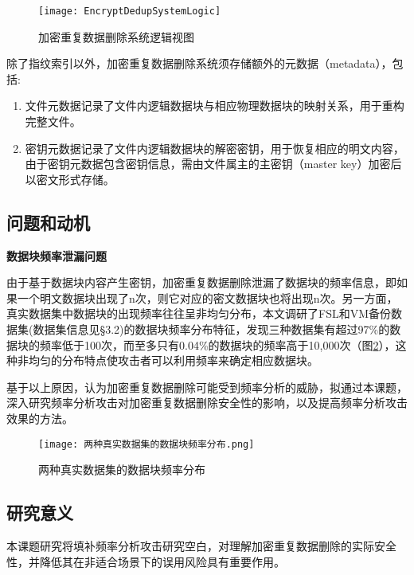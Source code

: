 \begin{figure}[!htb]
    \small
    \centering
    \texttt{[image: EncryptDedupSystemLogic]}
    \caption{加密重复数据删除系统逻辑视图}
    \label{fig:加密重复数据删除系统逻辑视图}
\end{figure}

除了指纹索引以外，加密重复数据删除系统须存储额外的元数据（metadata），包括:
\begin{enumerate}
    \item 文件元数据记录了文件内逻辑数据块与相应物理数据块的映射关系，用于重构完整文件。
    \item 密钥元数据记录了文件内逻辑数据块的解密密钥，用于恢复相应的明文内容，由于密钥元数据包含密钥信息，需由文件属主的主密钥（master key）加密后以密文形式存储。
\end{enumerate}

\subsection{问题和动机}

\textbf{数据块频率泄漏问题}

由于基于数据块内容产生密钥，加密重复数据删除泄漏了数据块的频率信息，即如果一个明文数据块出现了n次，则它对应的密文数据块也将出现n次。另一方面，真实数据集中数据块的出现频率往往呈非均匀分布，本文调研了FSL和VM备份数据集(数据集信息见§3.2)的数据块频率分布特征，发现三种数据集有超过97\%的数据块的频率低于100次，而至多只有0.04\%的数据块的频率高于10,000次（图\ref{fig:两种真实数据集的数据块频率分布}），这种非均匀的分布特点使攻击者可以利用频率来确定相应数据块。

基于以上原因，认为加密重复数据删除可能受到频率分析的威胁，拟通过本课题，深入研究频率分析攻击对加密重复数据删除安全性的影响，以及提高频率分析攻击效果的方法。


\begin{figure}[!htb]
    \small
    \centering
    \texttt{[image: 两种真实数据集的数据块频率分布.png]} %
    \caption{两种真实数据集的数据块频率分布} 
    \label{fig:两种真实数据集的数据块频率分布}
\end{figure}

\subsection{研究意义}

本课题研究将填补频率分析攻击研究空白，对理解加密重复数据删除的实际安全性，并降低其在非适合场景下的误用风险具有重要作用。

